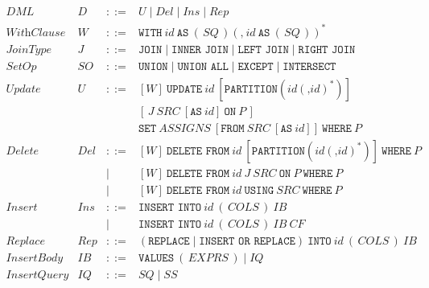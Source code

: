 \begin{figure}[t]
	\scriptsize
	\renewcommand{\arraystretch}{0.60}
	\[
	\begin{array}{rlcl}
		\textit{DML} & D & ::= &
		U \mid Del \mid Ins \mid Rep \\[2pt]
		
		\textit{WithClause} & W & ::= &
		\texttt{WITH}~id~\texttt{AS}~(\,SQ\,)(\texttt{,}~id~\texttt{AS}~(\,SQ\,))^* \\[2pt]
		
		\textit{JoinType} & J & ::= &
		\texttt{JOIN}
		\mid \texttt{INNER JOIN}
		\mid \texttt{LEFT JOIN}
		\mid \texttt{RIGHT JOIN} \\[2pt]
		
		\textit{SetOp} & SO & ::= &
		\texttt{UNION}
		\mid \texttt{UNION ALL}
		\mid \texttt{EXCEPT}
		\mid \texttt{INTERSECT} \\[2pt]
		
		\textit{Update} & U & ::= &
		[W]~\texttt{UPDATE}~id~[\texttt{PARTITION}(id(\texttt{,}id)^*)] \\
		& & & [\,J~SRC~[\texttt{AS}~id]~\texttt{ON}~P\,] \\
		& & & \texttt{SET}~ASSIGNS~[\texttt{FROM}~SRC~[\texttt{AS}~id]]~\texttt{WHERE}~P \\[2pt]
		
		\textit{Delete} & Del & ::= &
		[W]~\texttt{DELETE FROM}~id~[\texttt{PARTITION}(id(\texttt{,}id)^*)]~\texttt{WHERE}~P \\
		& & \mid &
		[W]~\texttt{DELETE FROM}~id~J~SRC~\texttt{ON}~P~\texttt{WHERE}~P \\
		& & \mid &
		[W]~\texttt{DELETE FROM}~id~\texttt{USING}~SRC~\texttt{WHERE}~P \\[2pt]
		
		\textit{Insert} & Ins & ::= &
		\texttt{INSERT INTO}~id~(\,COLS\,)~IB \\
		& & \mid &
		\texttt{INSERT INTO}~id~(\,COLS\,)~IB~CF \\[2pt]
		
		\textit{Replace} & Rep & ::= &
		(\texttt{REPLACE} \mid \texttt{INSERT OR REPLACE})~\texttt{INTO}~id~(\,COLS\,)~IB \\[2pt]
		
		\textit{InsertBody} & IB & ::= &
		\texttt{VALUES}~(\,EXPRS\,)
		\mid IQ \\[2pt]
		
		\textit{InsertQuery} & IQ & ::= &
		SQ \mid SS \\[2pt]
		

\end{array}\]
\end{figure}
